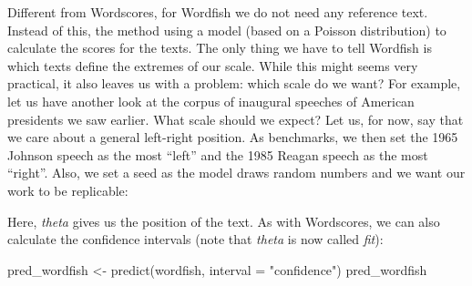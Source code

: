 \documentclass[
]{article}
\newenvironment{Shaded}{\begin{snugshade}}{\end{snugshade}}
\newcommand{\AttributeTok}[1]{\textcolor[rgb]{0.77,0.63,0.00}{#1}}
\newcommand{\DecValTok}[1]{\textcolor[rgb]{0.00,0.00,0.81}{#1}}
\newcommand{\FunctionTok}[1]{\textcolor[rgb]{0.00,0.00,0.00}{#1}}
\newcommand{\NormalTok}[1]{#1}
\newcommand{\OtherTok}[1]{\textcolor[rgb]{0.56,0.35,0.01}{#1}}
\newcommand{\SpecialCharTok}[1]{\textcolor[rgb]{0.00,0.00,0.00}{#1}}
\newcommand{\StringTok}[1]{\textcolor[rgb]{0.31,0.60,0.02}{#1}}
\begin{document}
Different from Wordscores, for Wordfish we do not need any reference text. Instead of this, the method using a model (based on a Poisson distribution) to calculate the scores for the texts. The only thing we have to tell Wordfish is which texts define the extremes of our scale. While this might seems very practical, it also leaves us with a problem: which scale do we want? For example, let us have another look at the corpus of inaugural speeches of American presidents we saw earlier. What scale should we expect? Let us, for now, say that we care about a general left-right position. As benchmarks, we then set the 1965 Johnson speech as the most ``left'' and the 1985 Reagan speech as the most ``right''. Also, we set a seed as the model draws random numbers and we want our work to be replicable:

\begin{Shaded}
\end{Shaded}

Here, \emph{theta} gives us the position of the text. As with Wordscores, we can also calculate the confidence intervals (note that \emph{theta} is now called \emph{fit}):

\begin{Shaded}
\begin{Highlighting}[]
\NormalTok{pred\_wordfish }\OtherTok{\textless{}{-}} \FunctionTok{predict}\NormalTok{(wordfish, }\AttributeTok{interval =} \StringTok{"confidence"}\NormalTok{)}
\NormalTok{pred\_wordfish}
\end{Highlighting}
\end{Shaded}
\end{document}
